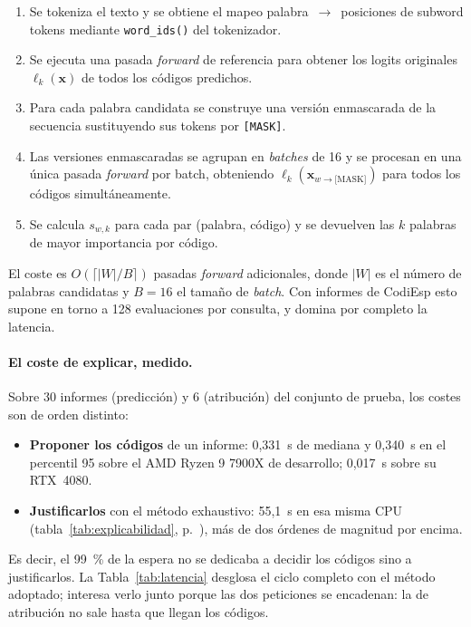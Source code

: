 \begin{enumerate}
 \item Se tokeniza el texto y se obtiene el mapeo palabra~$\to$~posiciones de subword tokens mediante \texttt{word\_ids()} del tokenizador.
 \item Se ejecuta una pasada \emph{forward} de referencia para obtener los logits originales $\ell_k(\mathbf{x})$ de todos los códigos predichos.
 \item Para cada palabra candidata se construye una versión enmascarada de la secuencia sustituyendo sus tokens por \texttt{[MASK]}.
 \item Las versiones enmascaradas se agrupan en \emph{batches} de 16 y se procesan en una única pasada \emph{forward} por batch, obteniendo $\ell_k(\mathbf{x}_{w \to \text{[MASK]}})$ para todos los códigos simultáneamente.
 \item Se calcula $s_{w,k}$ para cada par (palabra, código) y se devuelven las $k$ palabras de mayor importancia por código.
\end{enumerate}

El coste es $O(\lceil|W|/B\rceil)$ pasadas \emph{forward} adicionales, donde $|W|$ es el número de palabras candidatas y $B = 16$ el tamaño de \emph{batch}. Con informes de CodiEsp esto supone en torno a 128 evaluaciones por consulta, y domina por completo la latencia.

\paragraph{El coste de explicar, medido.}
Sobre 30 informes (predicción) y 6 (atribución) del conjunto de prueba, los costes son de orden distinto:

\begin{itemize}
 \item \textbf{Proponer los códigos} de un informe: 0{,}331~s de mediana y 0{,}340~s en el percentil 95 sobre el AMD Ryzen 9 7900X de desarrollo; 0{,}017~s sobre su RTX~4080.
 \item \textbf{Justificarlos} con el método exhaustivo: 55{,}1~s en esa misma CPU (tabla~\ref{tab:explicabilidad}, p.~\pageref{tab:explicabilidad}), más de dos órdenes de magnitud por encima.
\end{itemize}

Es decir, el 99~\% de la espera no se dedicaba a decidir los códigos sino a justificarlos. La Tabla~\ref{tab:latencia} desglosa el ciclo completo con el método adoptado; interesa verlo junto porque las dos peticiones se encadenan: la de atribución no sale hasta que llegan los códigos.


